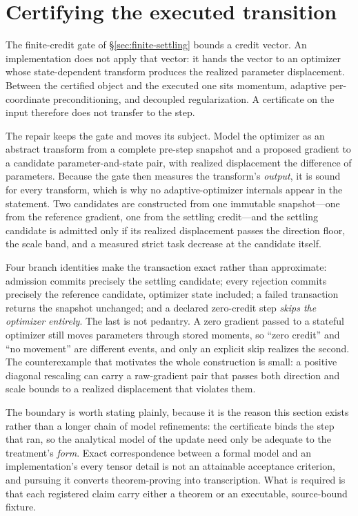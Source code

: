 \documentclass[11pt]{article}
\begin{document}
\section{Certifying the executed transition}
\label{sec:realized-displacement}

The finite-credit gate of \S\ref{sec:finite-settling} bounds a credit vector. An
implementation does not apply that vector: it hands the vector to an optimizer whose
state-dependent transform produces the realized parameter displacement. Between the
certified object and the executed one sits momentum, adaptive per-coordinate
preconditioning, and decoupled regularization. A certificate on the input therefore does
not transfer to the step.

The repair keeps the gate and moves its subject. Model the optimizer as an abstract
transform from a complete pre-step snapshot and a proposed gradient to a candidate
parameter-and-state pair, with realized displacement the difference of parameters. Because
the gate then measures the transform's \emph{output}, it is sound for every transform,
which is why no adaptive-optimizer internals appear in the statement. Two candidates are
constructed from one immutable snapshot---one from the reference gradient, one from the
settling credit---and the settling candidate is admitted only if its realized displacement
passes the direction floor, the scale band, and a measured strict task decrease at the
candidate itself.

Four branch identities make the transaction exact rather than approximate: admission
commits precisely the settling candidate; every rejection commits precisely the reference
candidate, optimizer state included; a failed transaction returns the snapshot unchanged;
and a declared zero-credit step \emph{skips the optimizer entirely}. The last is not
pedantry. A zero gradient passed to a stateful optimizer still moves parameters through
stored moments, so ``zero credit'' and ``no movement'' are different events, and only an
explicit skip realizes the second. The counterexample that motivates the whole
construction is small: a positive diagonal rescaling can carry a raw-gradient pair that
passes both direction and scale bounds to a realized displacement that violates them.

The boundary is worth stating plainly, because it is the reason this section exists rather
than a longer chain of model refinements: the certificate binds the step that ran, so the
analytical model of the update need only be adequate to the treatment's \emph{form}. Exact
correspondence between a formal model and an implementation's every tensor detail is not
an attainable acceptance criterion, and pursuing it converts theorem-proving into
transcription. What is required is that each registered claim carry either a theorem or an
executable, source-bound fixture.
\end{document}
